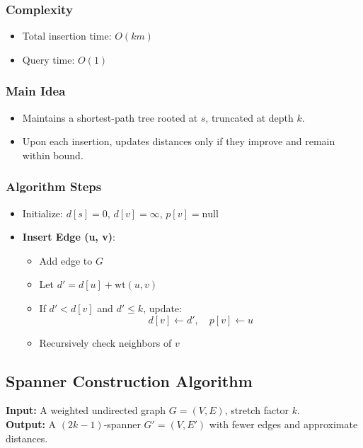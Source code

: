 \documentclass[11pt]{article}
\begin{document}
\subsubsection*{Complexity}
\begin{itemize}
    \item Total insertion time: \( O(km) \)
    \item Query time: \( O(1) \)
\end{itemize}

\subsubsection*{Main Idea}
\begin{itemize}
    \item Maintains a shortest-path tree rooted at \( s \), truncated at depth \( k \).
    \item Upon each insertion, updates distances only if they improve and remain within bound.
\end{itemize}

\subsubsection*{Algorithm Steps}
\begin{itemize}
    \item Initialize: \( d[s] = 0 \), \( d[v] = \infty \), \( p[v] = \text{null} \)
    \item \textbf{Insert Edge (u, v)}:
    \begin{itemize}
        \item Add edge to \( G \)
        \item Let \( d' = d[u] + \text{wt}(u,v) \)
        \item If \( d' < d[v] \) and \( d' \leq k \), update:
        \[
        d[v] \leftarrow d', \quad p[v] \leftarrow u
        \]
        \item Recursively check neighbors of \( v \)
    \end{itemize}
\end{itemize}

\subsection*{Spanner Construction Algorithm}

\textbf{Input:} A weighted undirected graph \( G = (V, E) \), stretch factor \( k \).\\
\textbf{Output:} A \((2k - 1)\)-spanner \( G' = (V, E') \) with fewer edges and approximate distances.
\end{document}

